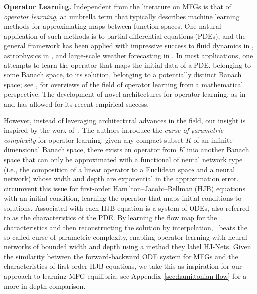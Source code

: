 \documentclass[11pt,reqno]{amsart}
\numberwithin{equation}{section}
\theoremstyle{plain}
\newcommand{\1}{\boldsymbol{\mathbbm{1}}}
\begin{document}
\noindent\textbf{Operator Learning.}
Independent from the literature on MFGs is that of \textit{operator learning}, an umbrella term that typically describes machine learning methods for approximating maps between function spaces. One natural application of such methods is to partial differential equations (PDEs), and the general framework has been applied with impressive success to fluid dynamics in \cite{li2021fourier, kovachki-neuralop}, astrophysics in \cite{Mao2023}, and large-scale weather forecasting in \cite{Kurth2023, Lam2023}. In most applications, one attempts to learn the operator that maps the initial data of a PDE, belonging to some Banach space, to its solution, belonging to a potentially distinct Banach space; see \cite{kovachki-review, boulle-review}, for overviews of the field of operator learning from a mathematical perspective. The development of novel architectures for operator learning, as in \cite{li2021fourier} and \cite{Lu2021, Wang2021} has allowed for its recent empirical success.

However, instead of leveraging architectural advances in the field, our insight is inspired by the work of~\cite{Lanthaler2025}. The authors introduce the \textit{curse of parametric complexity}
for operator learning: given any compact subset $K$ of an infinite-dimensional Banach space, there exists an operator from $K$ into another Banach space that can only be approximated with a functional of neural network type (i.e., the composition of a linear operator to a Euclidean space and a neural network) whose width and depth are exponential in the approximation error.~\cite{Lanthaler2025} circumvent this issue for first-order Hamilton--Jacobi--Bellman (HJB) equations with an initial condition, learning the operator that maps initial conditions to solutions. Associated with each HJB equation is a system of ODEs, also referred to as the characteristics of the PDE. By learning the flow map for the characteristics and then reconstructing the solution by interpolation,~\cite[Theorem 5.1]{Lanthaler2025} beats the so-called curse of parametric complexity, enabling operator learning with neural networks of bounded width and depth using a method they label HJ-Nets. Given the similarity between the forward-backward ODE system for MFGs and the characteristics of first-order HJB equations, we take this as inspiration for our approach to learning MFG equilibria; see Appendix~\ref{sec:hamiltonian-flow} for a more in-depth comparison.
\end{document}
